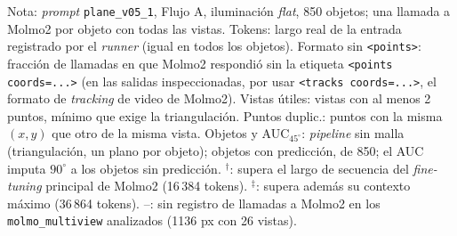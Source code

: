 \begin{table}[htbp]
\vspace{1.5ex}
\begin{minipage}{\wd\tablebox}
\footnotesize
Nota: \textit{prompt} \texttt{plane\_v05\_1}, Flujo A, iluminación \textit{flat}, 850 objetos; una llamada a Molmo2 por objeto con todas las vistas. Tokens: largo real de la entrada registrado por el \textit{runner} (igual en todos los objetos). Formato sin \texttt{<points>}: fracción de llamadas en que Molmo2 respondió sin la etiqueta \texttt{<points coords=...>} (en las salidas inspeccionadas, por usar \texttt{<tracks coords=...>}, el formato de \textit{tracking} de video de Molmo2). Vistas útiles: vistas con al menos 2 puntos, mínimo que exige la triangulación. Puntos duplic.: puntos con la misma $(x, y)$ que otro de la misma vista. Objetos y AUC$_{45^\circ}$: \textit{pipeline} sin malla (triangulación, un plano por objeto); objetos con predicción, de 850; el AUC imputa $90^\circ$ a los objetos sin predicción. $^{\dagger}$: supera el largo de secuencia del \textit{fine-tuning} principal de Molmo2 (16\,384 tokens). $^{\ddagger}$: supera además su contexto máximo (36\,864 tokens). --: sin registro de llamadas a Molmo2 en los \texttt{molmo\_multiview} analizados (1136 px con 26 vistas). 
\end{minipage}
\end{table}

